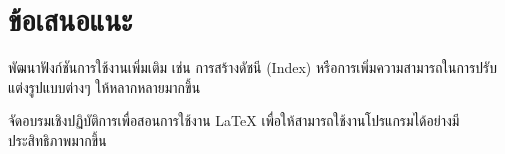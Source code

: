\section{ข้อเสนอแนะ}
\begin{mycustomenum}[label=5.4.\arabic*] 
    \item พัฒนาฟังก์ชันการใช้งานเพิ่มเติม เช่น การสร้างดัชนี (Index) หรือการเพิ่มความสามารถในการปรับแต่งรูปแบบต่างๆ ให้หลากหลายมากขึ้น
    \item จัดอบรมเชิงปฏิบัติการเพื่อสอนการใช้งาน LaTeX เพื่อให้สามารถใช้งานโปรแกรมได้อย่างมีประสิทธิภาพมากขึ้น 
\end{mycustomenum}